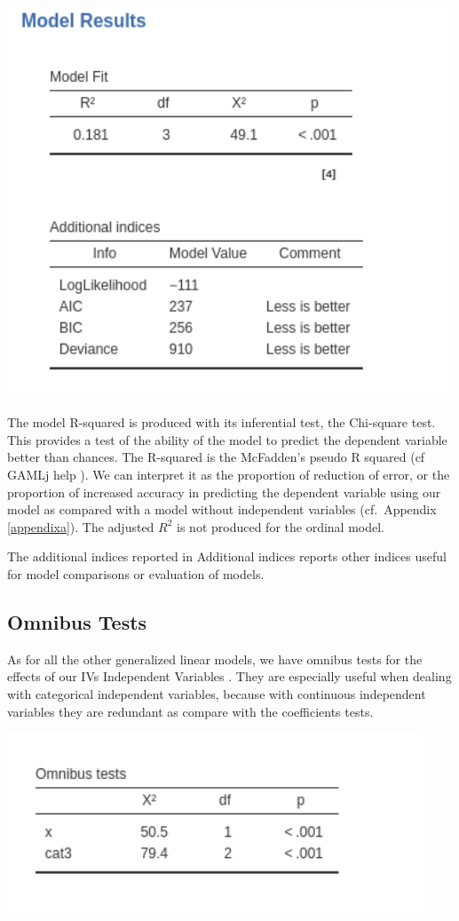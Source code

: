 \documentclass[
]{book}
\begin{document}
\includegraphics[width=5.19in]{bookletpics/3_ordinal_output2}

The model R-squared is produced with its inferential test, the Chi-square test. This provides a test of the ability of the model to predict the dependent variable better than chances. The R-squared is the McFadden's pseudo R squared (cf GAMLj help
). We can interpret it as the proportion of reduction of error, or the proportion of increased accuracy in predicting the dependent variable using our model as compared with a model without independent variables (cf.~Appendix \ref{appendixa}). The adjusted \(R^2\) is not produced for the ordinal model.

The additional indices reported in {Additional indices} reports other indices useful for model comparisons or evaluation of models.

\hypertarget{omnibus-tests-3}{%
\subsection{Omnibus Tests}\label{omnibus-tests-3}}

As for all the other generalized linear models, we have omnibus tests for the effects of our {IVs {Independent Variables} }. They are especially useful when dealing with categorical independent variables, because with continuous independent variables they are redundant as compare with the coefficients tests.

\includegraphics[width=4.88in]{bookletpics/3_ordinal_output3}
\end{document}
